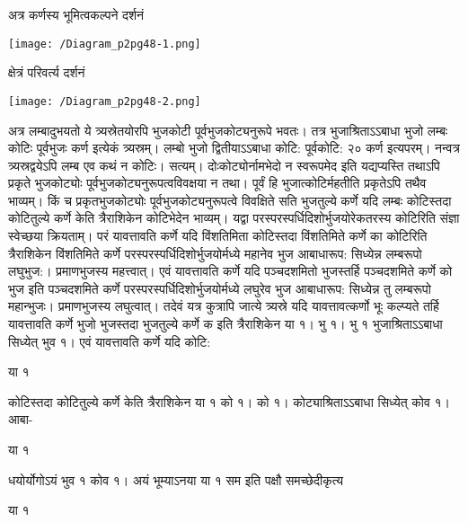\documentclass[11pt, openany]{book}
\begin{document}
\begin{sloppypar}
\hangindent=0.2in \hspace{0.2in}अत्र कर्णस्य भूमित्वकल्पने दर्शनं

\begin{center}
    \texttt{[image: /Diagram\_p2pg48-1.png]}
\end{center}

\hangindent=0.2in \hspace{0.2in}क्षेत्रं परिवर्त्य दर्शनं

\begin{center}
    \texttt{[image: /Diagram\_p2pg48-2.png]}
\end{center}

\hangindent=0.2in \hspace{0.2in}अत्र लम्बादुभयतो ये त्र्यस्रेतयोरपि भुजकोटी पूर्वभुजकोट्यनुरूपे भवतः। तत्र भुजाश्रिताऽऽबाधा भुजो लम्बः कोटिः पूर्वभुजः कर्ण इत्येकं त्र्यस्रम्। लम्बो भुजो द्वितीयाऽऽबाधा कोटि: पूर्वकोटि: २० कर्ण इत्यपरम्। नन्वत्र त्र्यस्रद्वयेऽपि लम्ब एव कथं न कोटिः। सत्यम्। दोःकोट्योर्नामभेदो न स्वरूपमेद इति यद्यप्यस्ति तथाऽपि प्रकृते भुजकोट्योः पूर्वभुजकोट्यनुरूपत्वविवक्षया न तथा। पूर्वं हि भुजात्कोटिर्महतीति प्रकृतेऽपि तथैव भाव्यम्। किं च प्रकृतभुजकोट्योः पूर्वभुजकोट्यनुरूपत्वे विवक्षिते सति भुजतुल्ये कर्णे यदि लम्बः कोटिस्तदा कोटितुल्ये कर्णे केति त्रैराशिकेन कोटिभेदेन भाव्यम्। यद्वा परस्परस्पर्धिदिशोर्भुजयोरेकतरस्य कोटिरिति संज्ञा स्वेच्छया क्रियताम्। परं यावत्तावति कर्णे यदि विंशतिमिता कोटिस्तदा विंशतिमिते कर्णे का कोटिरिति त्रैराशिकेन विंशतिमिते कर्णे परस्परस्पर्धिदिशोर्भुजयोर्मध्ये महानेव भुज आबाधारूप: सिध्येन्न लम्बरूपो लघुभुज:। प्रमाणभुजस्य महत्त्वात्। एवं यावत्तावति कर्णे यदि पञ्चदशमितो भुजस्तर्हि पञ्चदशमिते कर्णे को भुज इति पञ्चदशमिते कर्णे परस्परस्पर्धिदिशोर्भुजयोर्मध्ये लघुरेव भुज आबाधारूप: सिध्येन्न तु लम्बरूपो महान्भुजः। प्रमाणभुजस्य लघुत्वात्। तदेवं यत्र कुत्रापि जात्ये त्र्यस्रे यदि यावत्तावत्कर्णो भूः कल्प्यते तर्हि यावत्तावति कर्णे भुजो भुजस्तदा भुजतुल्ये कर्णे क इति त्रैराशिकेन या १। भु १। भु १ भुजाश्रिताऽऽबाधा सिध्येत् भुव १। एवं यावत्तावति कर्णे यदि कोटि:

\hspace{2.8in}या १

\hangindent=0.2in कोटिस्तदा कोटितुल्ये कर्णे केति त्रैराशिकेन या १ को १। को १। कोट्याश्रिताऽऽबाधा सिध्येत् कोव १। आबा-

या १

\hangindent=0.2in धयोर्योगोऽयं भुव १ कोव १। अयं भूम्याऽनया या १ सम इति पक्षौ समच्छेदीकृत्य

\hspace{1.25in}या १
\end{sloppypar}
\thispagestyle{empty}
\newpage
\end{document}
